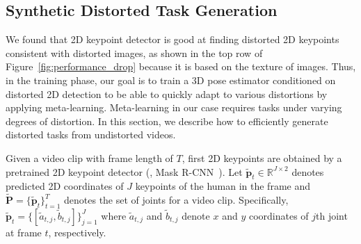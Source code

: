     \subsection{Synthetic Distorted Task Generation}
        \label{sec1}
        We found that 2D keypoint detector is good at finding distorted 2D keypoints consistent with distorted images, as shown in the top row of Figure~\ref{fig:performance_drop} because it is based on the texture of images. Thus, in the training phase, our goal is to train a 3D pose estimator conditioned on distorted 2D detection to be able to quickly adapt to various distortions by applying meta-learning. Meta-learning in our case requires tasks under varying degrees of distortion. In this section, we describe how to efficiently generate distorted tasks from undistorted videos.
        
        Given a video clip with frame length of $T$, first 2D keypoints are obtained by a pretrained 2D keypoint detector (\eg, Mask R-CNN~\cite{ref14_He_2017_ICCV}). Let $\tilde{\mathbf{p}}_t\in\mathbb{R}^{J\times2}$ denotes predicted 2D coordinates of $J$ keypoints of the human in the frame and $\tilde{\mathbf{P}} = \{\tilde{\mathbf{p}}_t\}_{t=1}^T$ denotes the set of joints for a video clip. Specifically, $\tilde{\mathbf{p}}_t = \{[\tilde{a}_{t,j},\tilde{b}_{t,j}]\}_{j=1}^J$ where $\tilde{a}_{t,j}$ and $\tilde{b}_{t,j}$ denote $x$ and $y$ coordinates of $j$th joint at frame $t$, respectively.
        
